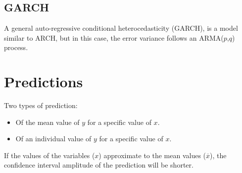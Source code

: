 \documentclass[10pt, a4paper, landscape]{extarticle}
\begin{document}
\begin{multicols}{3}
	\subsection*{GARCH}
		A general auto-regressive conditional heterocedasticity (GARCH), is a model similar to ARCH, but in this case, the error variance follows an ARMA($p$,$q$) process.

\section*{Predictions}
	Two types of prediction:
	\begin{itemize}[leftmargin=*]
		\item Of the mean value of $y$ for a specific value of $x$.
		\item Of an individual value of $y$ for a specific value of $x$.
	\end{itemize}
	If the values of the variables ($x$) approximate to the mean values ($\overline{x}$), the confidence interval amplitude of the prediction will be shorter. 

\end{multicols}
\end{document}
